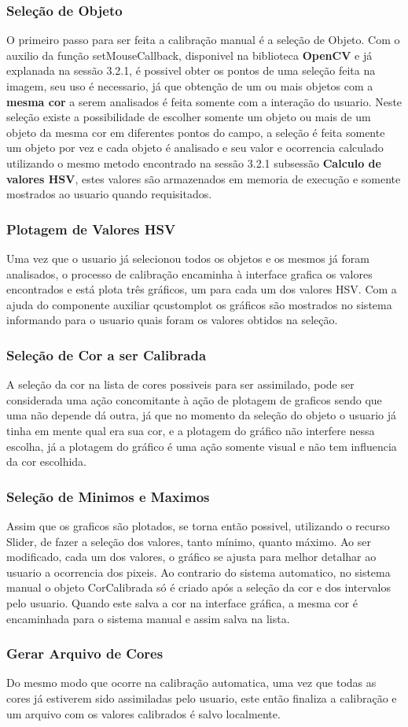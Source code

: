   	\subsubsection{Seleção de Objeto}	
  	O primeiro passo para ser feita a calibração manual é a seleção de Objeto. Com o auxilio da função setMouseCallback, disponivel na biblioteca \textbf{OpenCV} e já explanada na sessão 3.2.1, é possivel obter os pontos de uma seleção feita na imagem, seu uso é necessario, já que obtenção de um ou mais objetos com a \textbf{mesma cor} a serem analisados é feita somente com a interação do usuario. Neste seleção existe a possibilidade de escolher somente um objeto ou mais de um objeto da mesma cor em diferentes pontos do campo, a seleção é feita somente um objeto por vez e cada objeto é analisado e seu valor e ocorrencia calculado utilizando o mesmo metodo encontrado na sessão 3.2.1 subsessão \textbf{Calculo de valores HSV}, estes valores são armazenados em memoria de execução e somente mostrados ao usuario quando requisitados. 
  	
  	\subsubsection{Plotagem de Valores HSV}	
  	Uma vez que o usuario já selecionou todos os objetos e os mesmos já foram analisados, o processo de calibração encaminha à interface grafica os valores encontrados e está plota três gráficos, um para cada um dos valores HSV.
  	Com a ajuda do componente auxiliar qcustomplot os gráficos são mostrados no sistema informando para o usuario quais foram os valores obtidos na seleção.
  	
  	\subsubsection{Seleção de Cor a ser Calibrada}
  	A seleção da cor na lista de cores possiveis para ser assimilado, pode ser considerada uma ação concomitante à ação de plotagem de graficos sendo que uma não depende dá outra, já que no momento da seleção do objeto o usuario já tinha em mente qual era sua cor, e a plotagem do gráfico não interfere nessa escolha, já a plotagem do gráfico é uma ação somente visual e não tem influencia da cor escolhida.
  	
  	\subsubsection{Seleção de Minimos e Maximos}
  	 Assim que os graficos são plotados, se torna então possivel, utilizando o recurso Slider, de fazer a seleção dos valores, tanto mínimo, quanto máximo. Ao ser modificado, cada um dos valores, o gráfico se ajusta para melhor detalhar ao usuario a ocorrencia dos pixeis. Ao contrario do sistema automatico, no sistema manual o objeto CorCalibrada só é criado após a seleção da cor e dos intervalos pelo usuario. Quando este salva a cor na interface gráfica, a mesma cor é encaminhada para o sistema manual e assim salva na lista.
  	 
  	 
\subsubsection{Gerar Arquivo de Cores}
Do mesmo modo que ocorre na calibração automatica, uma vez que todas as cores já estiverem sido assimiladas pelo usuario, este então finaliza a calibração e um arquivo com os valores calibrados é salvo localmente.
  	   	
  		
  	